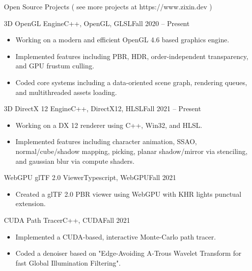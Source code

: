 \documentclass[]{mcdowellcv}
\begin{document}
	\begin{cvsection}{Open Source Projects ( see more projects at https://www.zixin.dev )}
		\begin{cvsubsection}{3D OpenGL Engine}{C++, OpenGL, GLSL}{Fall 2020 -- Present}	
			\begin{itemize}
				\item Working on a modern and efficient OpenGL 4.6 based graphics engine.
				\item Implemented features including PBR, HDR, order-independent transparency, and GPU frustum culling. 
				\item Coded core systems including a data-oriented scene graph, rendering queues, and multithreaded assets loading.
			\end{itemize}
		\end{cvsubsection}

		\begin{cvsubsection}{3D DirectX 12 Engine}{C++, DirectX12, HLSL}{Fall 2021 -- Present}		
			\begin{itemize}
				\item Working on a DX 12 renderer using C++, Win32, and HLSL.
				\item Implemented features including character animation, SSAO, normal/cube/shadow mapping, picking, planar shadow/mirror via stenciling, and gaussian blur via compute shaders.
			\end{itemize}
		\end{cvsubsection}

		\begin{cvsubsection}{WebGPU glTF 2.0 Viewer}{Typescript, WebGPU}{Fall 2021}
			\begin{itemize}
				\item Created a glTF 2.0 PBR viewer using WebGPU with KHR lights punctual extension. 
			\end{itemize}
		\end{cvsubsection}

		\begin{cvsubsection}{CUDA Path Tracer}{C++, CUDA}{Fall 2021}	
			\begin{itemize}
				\item Implemented a CUDA-based, interactive Monte-Carlo path tracer. 
				\item Coded a denoiser based on "Edge-Avoiding A-Trous Wavelet Transform for fast Global Illumination Filtering". 
			\end{itemize}
		\end{cvsubsection}
		
	\end{cvsection}
	
\end{document}
